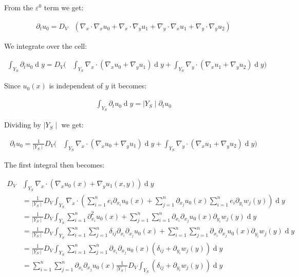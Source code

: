 \documentclass[10pt, a4paper]{article}
\begin{document}
 
 From the $\varepsilon^0$ term we get:
 
 \begin{align*}
 \partial_t u_0 = D_V & (\nabla_x \cdot \nabla_x u_0 + \nabla_x \cdot \nabla_y u_1 + \nabla_y \cdot \nabla_x u_1 + \nabla_y \cdot \nabla_y u_2)
 \end{align*}
 

 
 We integrate over the cell:
 
 \begin{align*}
 \int_{Y_S} \partial_t u_0 \operatorname{d} y = 
       D_V (& \int_{Y_S} \nabla_x \cdot (\nabla_x u_0 +    \nabla_y u_1) \operatorname{d} y 
       + \int_{Y_S} \nabla_y \cdot (\nabla_x u_1 + \nabla_y u_2) \operatorname{d} y )
 \end{align*}
 
 Since $u_0(x)$ is independent of $y$ it becomes:
 
 \begin{align*}
  \int_{Y_S} \partial_t u_0 \operatorname{d} y = \mid Y_S \mid \partial_t u_0 
 \end{align*}
 
 Dividing by $\mid Y_S \mid$ we get:
 
 \begin{align*}
 \partial_t u_0 =   \frac{1}{\mid Y_S \mid}     D_V (& \int_{Y_S} \nabla_x \cdot (\nabla_x u_0 +    \nabla_y u_1) \operatorname{d} y 
       + \int_{Y_S} \nabla_y \cdot (\nabla_x u_1 + \nabla_y u_2) \operatorname{d} y )
 \end{align*}
 
 
 The first integral then becomes:
 
 \begin{align*}
 D_V &\int_{Y_S} \nabla_x \cdot (\nabla_x u_0(x) + \nabla_yu_1(x,y)) \operatorname{d}y \\
 &= \frac{1}{\mid Y_S \mid} D_V \int_{Y_S} \nabla_x \cdot (\sum_{i=1}^n e_i \partial_{x_i} u_0(x) + \sum_{j=1}^n 
  \partial_{x_j} u_0(x) \sum_{i=1}^n e_i\partial_{y_i}w_j(y)) \operatorname{d} y\\
 &= \frac{1}{\mid Y_S \mid}D_V \int_{Y_S} \sum_{i=1}^n \partial_{x_i}^2 u_0(x) + \sum_{j=1}^n\sum_{i=1}^n 
 \partial_{x_i}\partial_{x_j}u_0(x) \partial_{y_i}w_j(y)\operatorname{d}y\\
 &=\frac{1}{\mid Y_S \mid} D_V \int_{Y_S} \sum_{i=1}^n\sum_{j=1}^n \delta_{ij}\partial_{x_i}\partial_{x_j}u_0(x)
 + \sum_{i=1}^n\sum_{j=1}^n \partial_{x_i}\partial_{x_j} u_0(x) \partial_{y_i}w_j(y)\operatorname{d}y\\
 &= \frac{1}{\mid Y_S \mid}D_V \int_{Y_S} \sum_{i=1}^n\sum_{j=1}^n\partial_{x_i}\partial_{x_j} u_0(x)
 (\delta_{ij} + \partial_{y_i} w_j(y))\operatorname{d}y\\
 &= \sum_{i=1}^n\sum_{j=1}^n\partial_{x_i}\partial_{x_j} u_0(x)
 \frac{1}{\mid Y_S \mid}D_V \int_{Y_S}(\delta_{ij} + \partial_{y_i} w_j(y))\operatorname{d}y
 \end{align*}
 
\end{document}

